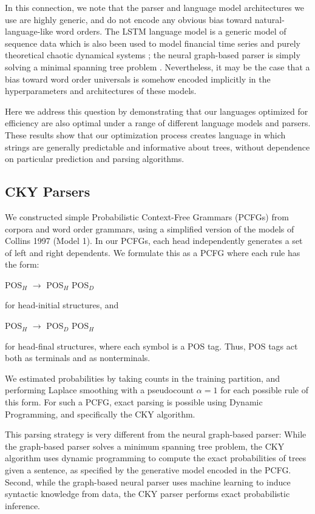 \documentclass[10pt,twoside,lineno]{article}
\begin{document}
In this connection, we note that the parser and language model architectures we use are highly generic, and do not encode any obvious bias toward natural-language-like word orders. The LSTM language model is a generic model of sequence data which is also been used to model financial time series \citep{sirignano2018universal} and purely theoretical chaotic dynamical systems \citep{ogunmolu2016nonlinear}; the neural graph-based parser is simply solving a minimal spanning tree problem \citep{mcdonald2005nonprojective}. Nevertheless, it may be the case that a bias toward word order universals is somehow encoded implicitly in the hyperparameters and architectures of these models.

Here we address this question by demonstrating that our languages optimized for efficiency are also optimal under a range of different language models and parsers. These results show that our optimization process creates language in which strings are generally predictable and informative about trees, without dependence on particular prediction and parsing algorithms.

\subsection{CKY Parsers}


We constructed simple Probabilistic Context-Free Grammars (PCFGs) from corpora and word order grammars, using a simplified version of the models of Collins 1997 (Model 1).
In our PCFGs, each head independently generates a set of left and right dependents.
We formulate this as a PCFG where each rule has the form:
\begin{center}
	POS$_H$ $\rightarrow$ POS$_H$ POS$_D$
\end{center}
for head-initial structures, and
\begin{center}
	POS$_H$ $\rightarrow$ POS$_D$ POS$_H$
\end{center}
for head-final structures, where each symbol is a POS tag.
Thus, POS tags act both as terminals and as nonterminals.

We estimated probabilities by taking counts in the training partition, and performing Laplace smoothing with a pseudocount $\alpha=1$ for each possible rule of this form.
For such a PCFG, exact parsing is possible using Dynamic Programming, and specifically the CKY algorithm.

This parsing strategy is very different from the neural graph-based parser:
While the graph-based parser solves a minimum spanning tree problem, the CKY algorithm uses dynamic programming to compute the exact probabilities of trees given a sentence, as specified by the generative model encoded in the PCFG.
Second, while the graph-based neural parser uses machine learning to induce syntactic knowledge from data, the CKY parser performs exact probabilistic inference.
\end{document}
